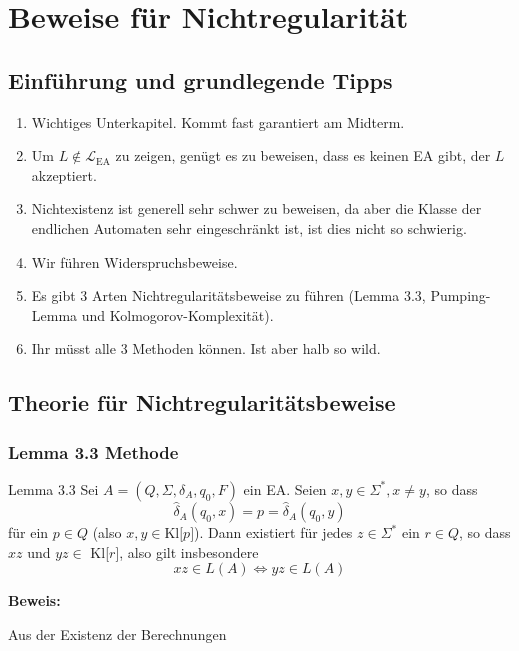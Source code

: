 \documentclass[a4paper, 11pt]{article}
\begin{document}
\section{Beweise für Nichtregularität}


    \subsection{Einführung und grundlegende Tipps}
    \begin{enumerate}[label= \roman*.]
        \item Wichtiges Unterkapitel. Kommt fast garantiert am Midterm.
        \item Um $L \notin \mathcal{L}_{\text{EA}}$ zu zeigen, genügt es zu beweisen, dass es keinen EA gibt, der $L$ akzeptiert.
        \item Nichtexistenz ist generell sehr schwer zu beweisen, da aber die Klasse der endlichen Automaten sehr eingeschränkt ist, ist dies nicht so schwierig.
        \item Wir führen Widerspruchsbeweise.
        \item Es gibt 3 Arten Nichtregularitätsbeweise zu führen (Lemma 3.3, Pumping-Lemma und Kolmogorov-Komplexität).
        \item Ihr müsst alle 3 Methoden können. Ist aber halb so wild.
     \end{enumerate}

\subsection{Theorie für Nichtregularitätsbeweise}

\subsubsection{Lemma 3.3 Methode}
    \begin{mainbox}{Lemma 3.3}
        Sei $A = (Q, \Sigma, \delta_A, q_0, F)$ ein EA. Seien $x, y \in \Sigma^*, x \neq y$, so dass 
    $$\hat{\delta}_A(q_0, x) = p = \hat{\delta}_A(q_0, y)$$
    für ein $p \in Q$ (also $x,y \in \text{Kl[$p$]}$). Dann existiert für jedes $z \in \Sigma^*$ ein $r \in Q$, so dass $xz$ und $yz \in$ Kl[$r$], also gilt insbesondere 
    $$xz \in L(A) \iff yz \in L(A)$$
    \end{mainbox}

    \textbf{Beweis: }
    
    Aus der Existenz der Berechnungen 
\end{document}
